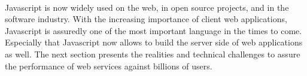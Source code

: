\paragraph{}

Javascript is now widely used on the web, in open source projects, and in the software industry.
With the increasing importance of client web applications, Javascript is assuredly one of the most important language in the times to come.
Especially that Javascript now allows to build the server side of web applications as well.
The next section presents the realities and technical challenges to assure the performance of web services against billions of users.










